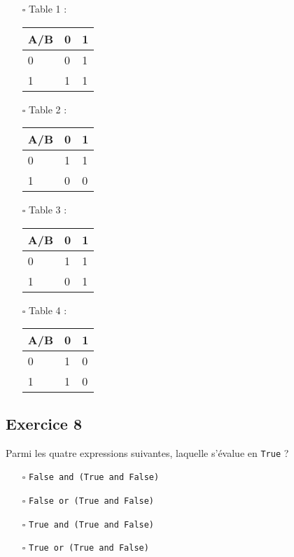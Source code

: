 \documentclass[11pt,a4paper]{article}
\providecommand{\tightlist}{\setlength{\itemsep}{0pt}\setlength{\parskip}{0pt}}
\begin{document}
\begin{itemize}
\item[$\square$]
  Table 1 :

  \begin{longtable}[]{@{}lll@{}}
  \toprule
  A/B & 0 & 1\tabularnewline
  \midrule
  \endhead
  0 & 0 & 1\tabularnewline
  1 & 1 & 1\tabularnewline
  \bottomrule
  \end{longtable}
\item[$\square$]
  Table 2 :

  \begin{longtable}[]{@{}lll@{}}
  \toprule
  A/B & 0 & 1\tabularnewline
  \midrule
  \endhead
  0 & 1 & 1\tabularnewline
  1 & 0 & 0\tabularnewline
  \bottomrule
  \end{longtable}
\item[$\square$]
  Table 3 :

  \begin{longtable}[]{@{}lll@{}}
  \toprule
  A/B & 0 & 1\tabularnewline
  \midrule
  \endhead
  0 & 1 & 1\tabularnewline
  1 & 0 & 1\tabularnewline
  \bottomrule
  \end{longtable}
\item[$\square$]
  Table 4 :

  \begin{longtable}[]{@{}lll@{}}
  \toprule
  A/B & 0 & 1\tabularnewline
  \midrule
  \endhead
  0 & 1 & 0\tabularnewline
  1 & 1 & 0\tabularnewline
  \bottomrule
  \end{longtable}
\end{itemize}

 

\hypertarget{octicons-pencil-16-exercice-8}{%
\subsection*{\faPencil* Exercice
8}\label{octicons-pencil-16-exercice-8}}

Parmi les quatre expressions suivantes, laquelle s'évalue en
\lstinline!True! ?

\begin{itemize}
\tightlist
\item[$\square$]
  \lstinline!False and (True and False)!
\item[$\square$]
  \lstinline!False or (True and False)!
\item[$\square$]
  \lstinline!True and (True and False)!
\item[$\square$]
  \lstinline!True or (True and False)!
\end{itemize}
\end{document}
